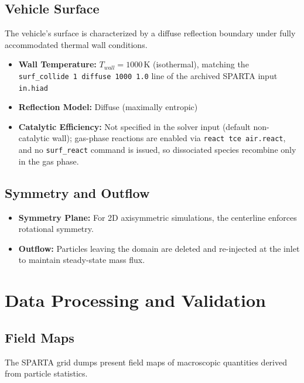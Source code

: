 \subsection{Vehicle Surface}
The vehicle's surface is characterized by a diffuse reflection boundary under fully accommodated thermal wall conditions.
\begin{itemize}
    \item \textbf{Wall Temperature:} $T_{wall} = 1000$\,K (isothermal), matching the \texttt{surf\_collide 1 diffuse 1000 1.0} line of the archived SPARTA input \texttt{in.hiad}

    \item \textbf{Reflection Model:} Diffuse (maximally entropic)

    \item \textbf{Catalytic Efficiency:} Not specified in the solver input (default non-catalytic wall); gas-phase reactions are enabled via \texttt{react tce air.react}, and no \texttt{surf\_react} command is issued, so dissociated species recombine only in the gas phase.
\end{itemize}

\subsection{Symmetry and Outflow}
\begin{itemize}
    \item \textbf{Symmetry Plane:} For 2D axisymmetric simulations, the centerline enforces rotational symmetry.

    \item \textbf{Outflow:} Particles leaving the domain are deleted and re-injected at the inlet to maintain steady-state mass flux.
\end{itemize}

\section{Data Processing and Validation}

\subsection{Field Maps}
The SPARTA grid dumps present field maps of macroscopic quantities derived from particle statistics.


